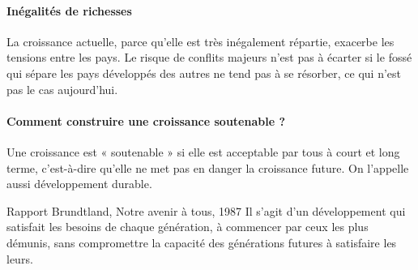 \documentclass[10pt,a4paper,french]{article}
\begin{document}
\paragraph{Inégalités de richesses}

La croissance actuelle, parce qu’elle est très inégalement répartie, exacerbe les tensions entre les pays. Le
risque de conflits majeurs n’est pas à écarter si le fossé qui sépare les pays développés des autres ne tend pas
à se résorber, ce qui n’est pas le cas aujourd’hui.

\paragraph{Comment construire une croissance soutenable ?}

Une croissance est « soutenable » si elle est acceptable par tous à court et long terme, c’est-à-dire qu’elle ne met pas en danger la croissance future. On l’appelle aussi développement durable.

\begin{cquote}{Rapport Brundtland, Notre avenir à tous, 1987}
Il s’agit d’un développement qui satisfait les besoins de chaque génération, à
commencer par ceux les plus démunis, sans compromettre la capacité des générations
futures à satisfaire les leurs.
\end{cquote}

\appendix %
\printindex
\end{document}
